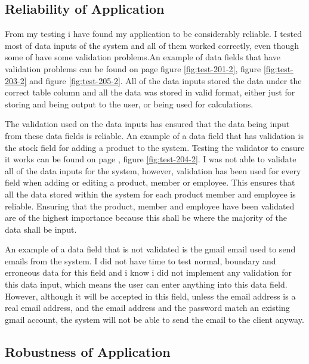 \subsection{Reliability of Application}

From my testing i have found my application to be considerably reliable. I tested most of data inputs of the system and all of them worked correctly, even though some of have some validation problems.An example of data fields that have validation problems can be found on page \pageref{fig:test-201-2} figure \ref{fig:test-201-2},  \pageref{fig:test-203-2} figure \ref{fig:test-203-2} and \pageref{fig:test-205-2} figure \ref{fig:test-205-2}. All of the data inputs stored the data under the correct table column and all the data was stored in valid format, either just for storing and being output to the user, or being used for  calculations. \par

The validation used on the data inputs has ensured that the data being input from these data fields is reliable. An example of a data field that has validation is the stock field for adding a product to the system. Testing the validator to ensure it works can be found on page \pageref{fig:test-204-2}, figure \ref{fig:test-204-2}.
I was not able to validate all of the data inputs for the system, however,  validation has been used for every field when adding or editing a product, member or employee. This ensures that all the data stored within the system for each product member and employee is reliable. Ensuring that the product, member and employee have been validated are of the highest importance because this shall be where the majority of the data shall be input.\par

An example of a data field that is not validated is the gmail email used to send emails from the system. I did not have time to test normal, boundary and erroneous data for this field and i know i did not implement any validation for this data input, which means the user can enter anything into this data field. However, although it will be accepted in this field, unless the email address is a real email address, and the email address and the password match an existing gmail account, the system will not be able to send the email to the client anyway.


\subsection{Robustness of Application}

